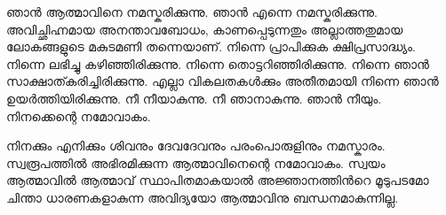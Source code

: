 ഞാന്‍ ആത്മാവിനെ നമസ്കരിക്കുന്നു. ഞാന്‍ എന്നെ നമസ്കരിക്കുന്നു. അവിച്ഛിഹ്നമായ അനന്താവബോധം, കാണപ്പെടുന്നതും അല്ലാത്തതുമായ ലോകങ്ങളുടെ മകുടമണി തന്നെയാണ്. നിന്നെ പ്രാപിക്കുക ക്ഷിപ്രസാദ്ധ്യം. നിന്നെ ലഭിച്ചു കഴിഞ്ഞിരിക്കുന്നു. നിന്നെ തൊട്ടറിഞ്ഞിരിക്കുന്നു. നിന്നെ ഞാന്‍ സാക്ഷാത്കരിച്ചിരിക്കുന്നു. എല്ലാ വികലതകള്‍ക്കും അതീതമായി നിന്നെ ഞാന്‍ ഉയര്‍ത്തിയിരിക്കുന്നു. നീ നീയാകുന്നു. നീ ഞാനാകുന്നു. ഞാന്‍ നീയും. നിനക്കെന്റെ നമോവാകം.

നിനക്കും എനിക്കും ശിവനും ദേവദേവനും പരംപൊരുളിനും നമസ്കാരം. സ്വരൂപത്തില്‍ അഭിരമിക്കുന്ന ആത്മാവിനെന്റെ നമോവാകം. സ്വയം ആത്മാവില്‍ ആത്മാവ് സ്ഥാപിതമാകയാല്‍  അജ്ഞാനത്തിന്‍റെ മൂടുപടമോ ചിന്താ ധാരണകളാകുന്ന അവിദ്യയോ ആത്മാവിനു ബന്ധനമാകുന്നില്ല.
